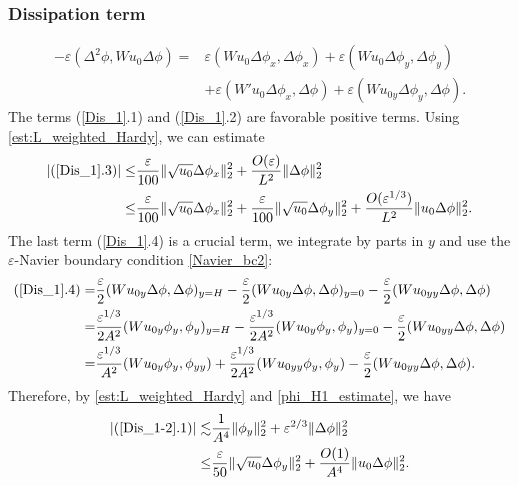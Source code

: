 \documentclass[reqno, 11pt]{amsart}
\theoremstyle{plain}
\theoremstyle{definition}
\theoremstyle{remark}
\numberwithin{equation}{section}
\begin{document}
\subsubsection{Dissipation term}
\begin{equation}\label{Dis_1}
\begin{aligned}
-\varepsilon (\Delta^2 \phi, W u_0 \Delta \phi) =& \varepsilon (Wu_0 \Delta \phi_x, \Delta \phi_x) + \varepsilon (Wu_0 \Delta \phi_y, \Delta \phi_y)\\
&+  \varepsilon (W' u_0 \Delta \phi_x, \Delta \phi)  +  \varepsilon (W u_{0y} \Delta \phi_y, \Delta \phi).
\end{aligned}
\end{equation}
The terms (\ref{Dis_1}.1) and (\ref{Dis_1}.2) are favorable positive terms. Using \eqref{est:L_weighted_Hardy}, we can estimate
\begin{equation}\label{Dis_1-1}
\begin{aligned}
|(\ref{Dis_1}.3)| \le & \frac{\varepsilon}{100} \| \sqrt{u_0} \Delta \phi_x\|_2^2 + \frac{O(\varepsilon)}{L^2} \|\Delta \phi \|_2^2\\
 \le & \frac{\varepsilon}{100} \| \sqrt{u_0} \Delta \phi_x\|_2^2 +\frac{\varepsilon}{100} \| \sqrt{u_0} \Delta \phi_y\|_2^2 + \frac{O(\varepsilon^{1/3})}{L^2} \|u_0 \Delta \phi\|_2^2.
\end{aligned}
\end{equation}
The last term (\ref{Dis_1}.4) is a crucial term, we integrate by parts in $y$ and use the $\varepsilon$-Navier boundary condition \eqref{Navier_bc2}:
\begin{equation}\label{Dis_1-2}
\begin{aligned}
(\ref{Dis_1}.4) =& \frac{\varepsilon}{2} (W u_{0y} \Delta \phi , \Delta \phi)_{y=H} - \frac{\varepsilon}{2} (W u_{0y} \Delta \phi , \Delta \phi)_{y=0} - \frac{\varepsilon}{2} (W u_{0yy} \Delta \phi, \Delta \phi) \\
=& \frac{\varepsilon^{1/3}}{2A^2} (W u_{0y} \phi_y ,\phi_y)_{y=H} - \frac{\varepsilon^{1/3}}{2A^2} (W u_{0y} \phi_y ,\phi_y)_{y=0} - \frac{\varepsilon}{2} (W u_{0yy} \Delta \phi, \Delta \phi)\\
=& \frac{\varepsilon^{1/3}}{A^2} (W u_{0y} \phi_y ,\phi_{yy}) + \frac{\varepsilon^{1/3}}{2A^2} (W u_{0yy} \phi_y ,\phi_y) - \frac{\varepsilon}{2} (W u_{0yy} \Delta \phi, \Delta \phi).
\end{aligned}
\end{equation}
Therefore, by \eqref{est:L_weighted_Hardy} and \eqref{phi_H1_estimate}, we have
\begin{equation}\label{Dis_1-3}
\begin{aligned}
|(\ref{Dis_1-2}.1)| \lesssim & \frac{1}{A^4} \| \phi_y\|_2^2 + \varepsilon^{2/3} \|\Delta \phi\|_2^2\\
\le& \frac{\varepsilon}{50} \|\sqrt{u_0} \Delta \phi_y\|_2^2 +  \frac{O(1)}{A^4} \|u_0 \Delta \phi\|_2^2.
\end{aligned}
\end{equation}
\end{document}
